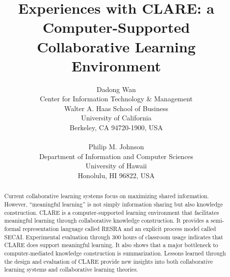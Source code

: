 


\title {Experiences with {CLARE}: a Computer-Supported\\ Collaborative
Learning Environment}

\author{Dadong Wan\\
Center for Information Technology \& Management\\
Walter A. Haas School of Business\\
University of California\\
Berkeley, CA 94720-1900, USA \\ \\
Philip M. Johnson\\
Department of Information and Computer Sciences\\
University of Hawaii\\
Honolulu, HI 96822, USA}

\maketitle
\begin{abstract}
  Current collaborative learning systems focus on maximizing shared
  information. However, ``meaningful learning'' is not simply information
  sharing but also knowledge construction.  CLARE is a computer-supported
  learning environment that facilitates meaningful learning through
  collaborative knowledge construction. It provides a semi-formal
  representation language called RESRA and an explicit process model
  called SECAI. Experimental evaluation through 300 hours of classroom
  usage indicates that CLARE does support meaningful learning. It also
  shows that a major bottleneck to computer-mediated knowledge
  construction is summarization.  Lessons learned through the design and
  evaluation of CLARE provide new insights into both collaborative
  learning systems and collaborative learning theories.
\end{abstract}

